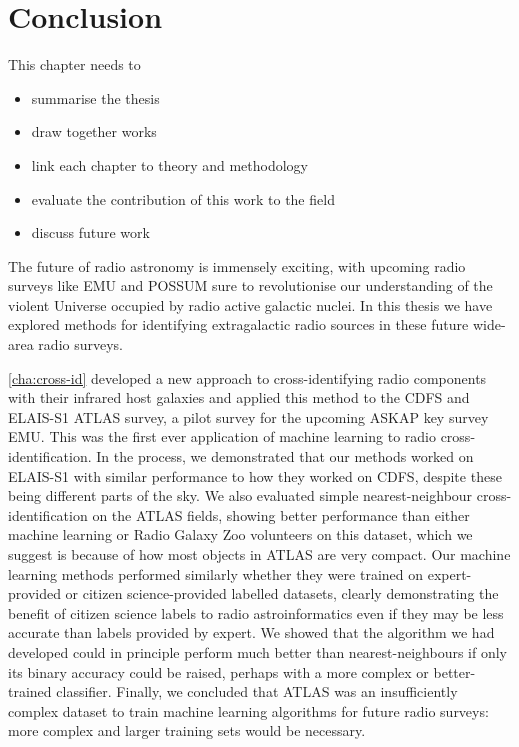 \chapter{Conclusion}
\label{cha:conc}

This chapter needs to
\begin{itemize}
    \item summarise the thesis
    \item draw together works
    \item link each chapter to theory and methodology
    \item evaluate the contribution of this work to the field
    \item discuss future work
\end{itemize}

The future of radio astronomy is immensely exciting, with upcoming radio surveys like EMU and POSSUM sure to revolutionise our understanding of the violent Universe occupied by radio active galactic nuclei. In this thesis we have explored methods for identifying extragalactic radio sources in these future wide-area radio surveys.

\autoref{cha:cross-id} developed a new approach to cross-identifying radio components with their infrared host galaxies and applied this method to the CDFS and ELAIS-S1 ATLAS survey, a pilot survey for the upcoming ASKAP key survey EMU. This was the first ever application of machine learning to radio cross-identification. In the process, we demonstrated that our methods worked on ELAIS-S1 with similar performance to how they worked on CDFS, despite these being different parts of the sky. We also evaluated simple nearest-neighbour cross-identification on the ATLAS fields, showing better performance than either machine learning or Radio Galaxy Zoo volunteers on this dataset, which we suggest is because of how most objects in ATLAS are very compact. Our machine learning methods performed similarly whether they were trained on expert-provided or citizen science-provided labelled datasets, clearly demonstrating the benefit of citizen science labels to radio astroinformatics even if they may be less accurate than labels provided by expert. We showed that the algorithm we had developed could in principle perform much better than nearest-neighbours if only its binary accuracy could be raised, perhaps with a more complex or better-trained classifier. Finally, we concluded that ATLAS was an insufficiently complex dataset to train machine learning algorithms for future radio surveys: more complex and larger training sets would be necessary.

